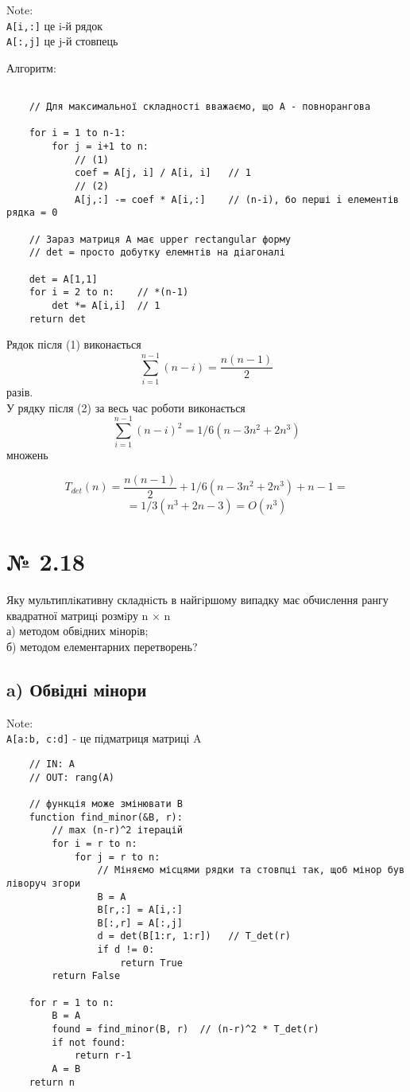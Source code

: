 \documentclass[11pt, a4paper]{article} %
\begin{document}
Note: \\
\texttt{A[i,:]} це i-й рядок\\
\texttt{A[:,j]} це j-й стовпець


Алгоритм:
\begin{lstlisting}

    // Для максимальної складності вважаємо, що А - повнорангова

    for i = 1 to n-1:
        for j = i+1 to n: 
            // (1)
            coef = A[j, i] / A[i, i]   // 1
            // (2)
            A[j,:] -= coef * A[i,:]    // (n-i), бо перші i елементів рядка = 0
        
    // Зараз матриця A має upper rectangular форму
    // det = просто добутку елемнтів на діагоналі

    det = A[1,1]
    for i = 2 to n:    // *(n-1)
        det *= A[i,i]  // 1
    return det
\end{lstlisting}

Рядок після (1) виконається $$\sum_{i=1}^{n-1} (n-i) = \frac{n(n-1)}{2}$$ разів.\\
У рядку після (2) за весь час роботи виконається $$\sum_{i=1}^{n-1} (n-i)^2 = 1/6 (n - 3 n^2 + 2 n^3)$$ множень

$$T_{det}(n) = \frac{n(n-1)}{2} + 1/6 (n - 3 n^2 + 2 n^3) + n-1 = $$
$$=1/3 (n^3 + 2 n - 3) = O(n^3)$$

\section*{№ 2.18}
\begin{mdframed}
    Яку мультиплiкативну складнiсть в найгiршому випадку має обчислення рангу квадратної матрицi розмiру n × n\\
а) методом обвiдних мiнорiв;\\
б) методом елементарних перетворень?
\end{mdframed}

\subsection*{a) Обвідні мінори}

Note: \\
\texttt{A[a:b, c:d]} - це підматриця матриці A 

\begin{lstlisting}
    // IN: A
    // OUT: rang(A)

    // функція може змінювати B
    function find_minor(&B, r):
        // max (n-r)^2 ітерацій
        for i = r to n:
            for j = r to n:
                // Міняємо місцями рядки та стовпці так, щоб мінор був ліворуч згори
                B = A
                B[r,:] = A[i,:]
                B[:,r] = A[:,j]
                d = det(B[1:r, 1:r])   // T_det(r)
                if d != 0:
                    return True
        return False
    
    for r = 1 to n:
        B = A
        found = find_minor(B, r)  // (n-r)^2 * T_det(r)
        if not found:
            return r-1
        A = B
    return n

\end{lstlisting}
\end{document}
